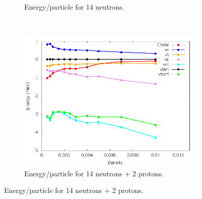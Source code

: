 \documentclass[12pt]{article}
\begin{document}
\begin{figure}[h!]
\begin{subfigure}{0.49\textwidth}
      \caption{Energy/particle for 14 neutrons.}
   \end{subfigure}
   ~
   \begin{subfigure}{0.49\textwidth}
      \includegraphics[width=\textwidth]{../av6_14n2p_lin.png}
      \caption{Energy/particle for 14 neutrons + 2 protons.}
   \end{subfigure}
\end{figure}
\newpage
\end{document}
